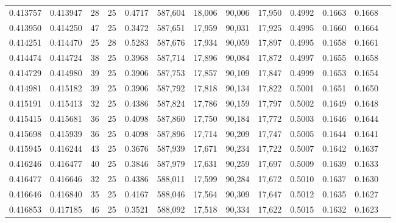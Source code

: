 \begin{tabular}{rrrrrrrrrrrrr}
0.413757 & 0.413947 &    28 &  25 &                                     0.4717 & 587,604 &  18,006 &  90,006 &  17,950 & 0.4992 & 0.1663 & 0.1668 \\
0.413950 & 0.414250 &    47 &  25 &                                     0.3472 & 587,651 &  17,959 &  90,031 &  17,925 & 0.4995 & 0.1660 & 0.1664 \\
0.414251 & 0.414470 &    25 &  28 &                                     0.5283 & 587,676 &  17,934 &  90,059 &  17,897 & 0.4995 & 0.1658 & 0.1661 \\
0.414474 & 0.414724 &    38 &  25 &                                     0.3968 & 587,714 &  17,896 &  90,084 &  17,872 & 0.4997 & 0.1655 & 0.1658 \\
0.414729 & 0.414980 &    39 &  25 &                                     0.3906 & 587,753 &  17,857 &  90,109 &  17,847 & 0.4999 & 0.1653 & 0.1654 \\
0.414981 & 0.415182 &    39 &  25 &                                     0.3906 & 587,792 &  17,818 &  90,134 &  17,822 & 0.5001 & 0.1651 & 0.1650 \\
0.415191 & 0.415413 &    32 &  25 &                                     0.4386 & 587,824 &  17,786 &  90,159 &  17,797 & 0.5002 & 0.1649 & 0.1648 \\
0.415415 & 0.415681 &    36 &  25 &                                     0.4098 & 587,860 &  17,750 &  90,184 &  17,772 & 0.5003 & 0.1646 & 0.1644 \\
0.415698 & 0.415939 &    36 &  25 &                                     0.4098 & 587,896 &  17,714 &  90,209 &  17,747 & 0.5005 & 0.1644 & 0.1641 \\
0.415945 & 0.416244 &    43 &  25 &                                     0.3676 & 587,939 &  17,671 &  90,234 &  17,722 & 0.5007 & 0.1642 & 0.1637 \\
0.416246 & 0.416477 &    40 &  25 &                                     0.3846 & 587,979 &  17,631 &  90,259 &  17,697 & 0.5009 & 0.1639 & 0.1633 \\
0.416477 & 0.416646 &    32 &  25 &                                     0.4386 & 588,011 &  17,599 &  90,284 &  17,672 & 0.5010 & 0.1637 & 0.1630 \\
0.416646 & 0.416840 &    35 &  25 &                                     0.4167 & 588,046 &  17,564 &  90,309 &  17,647 & 0.5012 & 0.1635 & 0.1627 \\
0.416853 & 0.417185 &    46 &  25 &                                     0.3521 & 588,092 &  17,518 &  90,334 &  17,622 & 0.5015 & 0.1632 & 0.1623 \\

\end{tabular}
